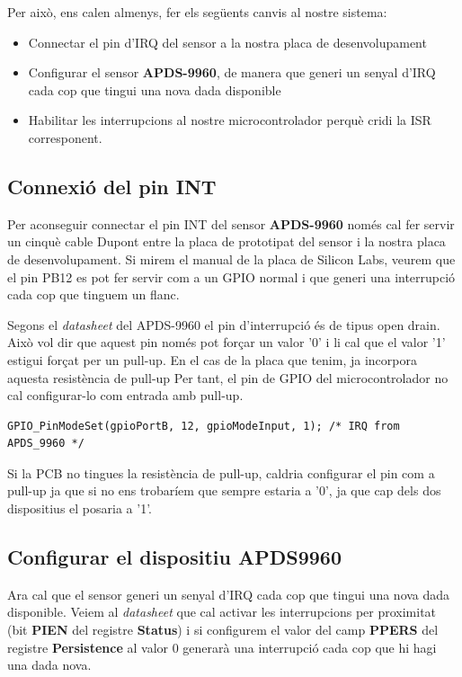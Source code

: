 Per això, ens calen almenys, fer els següents canvis al nostre sistema:
\begin{itemize}
 \item Connectar el pin d'\gls{IRQ} del sensor a la nostra placa de desenvolupament
 \item Configurar el sensor {\bf APDS-9960}, de manera que generi un senyal d'IRQ cada cop que tingui una nova dada disponible
 \item Habilitar les interrupcions al nostre microcontrolador perquè cridi la \gls{ISR} corresponent.
\end{itemize}

\subsection{Connexió del pin INT}
Per aconseguir connectar el pin INT del sensor {\bf APDS-9960} només cal fer servir un cinquè cable Dupont entre la placa de prototipat del sensor i la nostra placa de desenvolupament. Si mirem el manual de la placa de Silicon Labs, veurem que el pin PB12 es pot fer servir com a un GPIO normal i que generi una interrupció cada cop que tinguem un flanc.

Segons el {\em datasheet} \cite[3]{apds9960} del APDS-9960 el pin d'interrupció és de tipus \gls{open drain}. Això vol dir que aquest pin només pot forçar un valor '0' i li cal que el valor '1' estigui forçat per un \gls{pull-up}. En el cas de la placa que tenim, ja incorpora aquesta resistència de \gls{pull-up} Per tant, el pin de GPIO del microcontrolador no cal configurar-lo com entrada amb \gls{pull-up}.
\begin{lstlisting}[style=customc]
GPIO_PinModeSet(gpioPortB, 12, gpioModeInput, 1); /* IRQ from APDS_9960 */
\end{lstlisting}

Si la PCB no tingues la resistència de \gls{pull-up}, caldria configurar el pin com a \gls{pull-up} ja que si no ens trobaríem que sempre estaria a '0', ja que cap dels dos dispositius el posaria a '1'.

\subsection{Configurar el dispositiu APDS{\-}9960}
Ara cal que el sensor generi un senyal d'\gls{IRQ} cada cop que tingui una nova dada disponible.
Veiem al {\em datasheet} \cite[11 i 20]{apds9960} que cal activar les interrupcions per proximitat (bit {\bf PIEN} del registre {\bf Status}) i si configurem el valor del camp {\bf PPERS} del registre {\bf Persistence} al valor 0 generarà una interrupció cada cop que hi hagi una dada nova.

